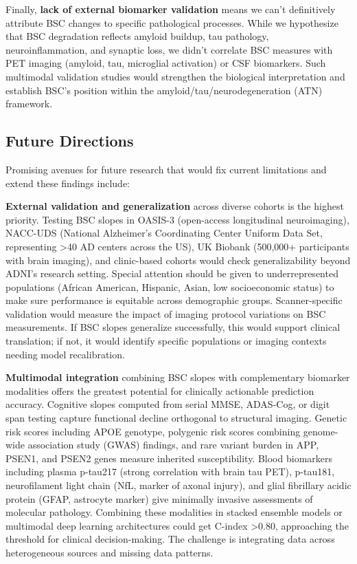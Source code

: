 \documentclass[blue]{ludusofficial}  %
\begin{document}
Finally, \textbf{lack of external biomarker validation} means we can't definitively attribute BSC changes to specific pathological processes. While we hypothesize that BSC degradation reflects amyloid buildup, tau pathology, neuroinflammation, and synaptic loss, we didn't correlate BSC measures with PET imaging (amyloid, tau, microglial activation) or CSF biomarkers. Such multimodal validation studies would strengthen the biological interpretation and establish BSC's position within the amyloid/tau/neurodegeneration (ATN) framework.

\subsection{Future Directions}

Promising avenues for future research that would fix current limitations and extend these findings include:

\textbf{External validation and generalization} across diverse cohorts is the highest priority. Testing BSC slopes in OASIS-3 (open-access longitudinal neuroimaging), NACC-UDS (National Alzheimer's Coordinating Center Uniform Data Set, representing >40 AD centers across the US), UK Biobank (500,000+ participants with brain imaging), and clinic-based cohorts would check generalizability beyond ADNI's research setting. Special attention should be given to underrepresented populations (African American, Hispanic, Asian, low socioeconomic status) to make sure performance is equitable across demographic groups. Scanner-specific validation would measure the impact of imaging protocol variations on BSC measurements. If BSC slopes generalize successfully, this would support clinical translation; if not, it would identify specific populations or imaging contexts needing model recalibration.

\textbf{Multimodal integration} combining BSC slopes with complementary biomarker modalities offers the greatest potential for clinically actionable prediction accuracy. Cognitive slopes computed from serial MMSE, ADAS-Cog, or digit span testing capture functional decline orthogonal to structural imaging. Genetic risk scores including APOE genotype, polygenic risk scores combining genome-wide association study (GWAS) findings, and rare variant burden in APP, PSEN1, and PSEN2 genes measure inherited susceptibility. Blood biomarkers including plasma p-tau217 (strong correlation with brain tau PET), p-tau181, neurofilament light chain (NfL, marker of axonal injury), and glial fibrillary acidic protein (GFAP, astrocyte marker) give minimally invasive assessments of molecular pathology. Combining these modalities in stacked ensemble models or multimodal deep learning architectures could get C-index >0.80, approaching the threshold for clinical decision-making. The challenge is integrating data across heterogeneous sources and missing data patterns.
\end{document}
